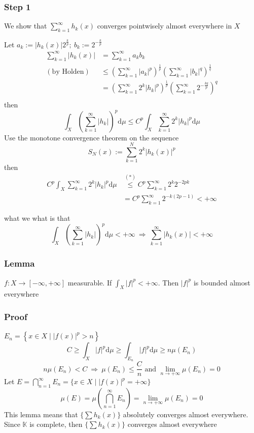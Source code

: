 \documentclass{book}
\newcommand{\abs}[1]{\left\lvert #1 \right\rvert}
\begin{document}
\subsubsection{Step 1}
We show that $\sum\limits_{k=1}^\infty h_k(x)$ converges pointwisely almost everywhere in $X$

Let $a_k:=\abs{h_k(x)}2^{\frac{k}{p}};\ b_k:=2^{-\frac{k}{p}}$
$$\begin{aligned}
    \sum\limits_{k=1}^\infty \abs{h_k(x)}&=\sum\limits_{k=1}^\infty a_kb_k\\
    (\text{by Holden})&\leq\left(\sum\limits_{k=1}^\infty \abs{a_k}^p\right)^{\frac{1}p}\left(\sum\limits_{k=1}^\infty \abs{b_k}^q\right)^{\frac{1}q}\\
    &=\left(\sum\limits_{k=1}^\infty 2^k\abs{h_k}^p\right)^{\frac{1}p}\left(\sum\limits_{k=1}^\infty 2^{-\frac{kq}{p}}\right)^q\\
\end{aligned}$$
then
$$\int_X(\sum\limits_{k=1}^\infty \abs{h_k})^p\text{d}\mu\leq C^p\int_X\sum\limits_{k=1}^\infty 2^k\abs{h_k}^p\text{d}\mu$$
Use the monotone convergence theorem on the sequence $$S_N(x):=\sum\limits_{k=1}^N 2^k\abs{h_k(x)}^p$$then
$$\begin{aligned}
    C^p\int_X\sum\limits_{k=1}^\infty 2^k\abs{h_k}^p\text{d}\mu&\stackrel{\hyperref[69.4.(1)]{(*)}}{\leq} C^p\sum\limits_{k=1}^\infty 2^k2^{-2pk}\\
    &=C^p\sum\limits_{k=1}^\infty 2^{-k(2p-1)}<+\infty
\end{aligned}$$

what we what is that
$$\int_X(\sum\limits_{k=1}^\infty \abs{h_k})^p\text{d}\mu<+\infty\ \Rightarrow\ \sum\limits_{k=1}^\infty\abs{h_k(x)}<+\infty$$
\subsubsection{Lemma}
$f:X\rightarrow[-\infty,+\infty]$ measurable. If $\int_X\abs{f}^p<+\infty$. Then $\abs{f}^p$ is bounded almost everywhere
\subsubsection*{Proof}
$E_n=\left\{x\in X\mid \abs{f(x)}^p>n\right\}$$$C\geq\int_X\abs{f}^p\text{d}\mu\geq\int_{E_n}\abs{f}^p\text{d}\mu\geq n\mu(E_n)$$
$$n\mu(E_n)<C\ \Rightarrow\ \mu(E_n)\leq\frac{C}n\text{ and }\lim\limits_{n\rightarrow+\infty}\mu(E_n)=0$$
Let $E=\bigcap\limits_{n=1}^\infty E_n=\{x\in X\mid\abs{f(x)}^p=+\infty\}$
$$\mu(E)=\mu(\bigcap\limits_{n=1}^\infty E_n)=\lim\limits_{n\rightarrow+\infty}\mu(E_n)=0$$
This lemma means that $\{\sum h_k(x)\}$ absolutely converges almost everywhere. Since $\mathbb{K}$ is  complete, then $\{\sum h_k(x)\}$ converges almost everywhere
\end{document}
